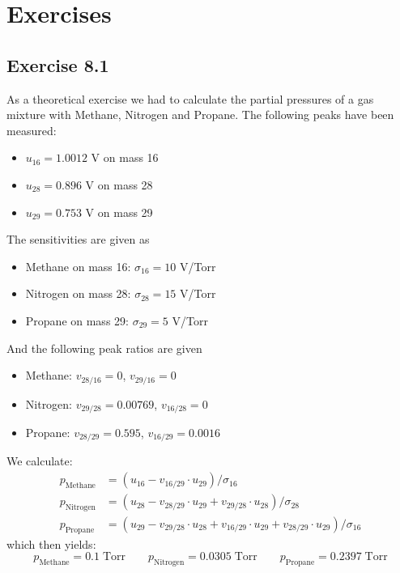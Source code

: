 \section{Exercises} \label{app:ex}
\subsection{Exercise 8.1}
As a theoretical exercise we had to calculate the partial pressures of a gas mixture with Methane, Nitrogen and Propane. The following peaks have been measured: 
\begin{itemize}
    \item $u_{16} = 1.0012$ V on mass 16
    \item $u_{28} = 0.896$ V on mass 28
    \item $u_{29} = 0.753$ V on mass 29
\end{itemize}
The sensitivities are given as
\begin{itemize}
    \item Methane on mass 16: $\sigma_{16} = 10$ V/Torr
    \item Nitrogen on mass 28: $\sigma_{28} = 15$ V/Torr
    \item Propane on mass 29: $\sigma_{29} = 5$ V/Torr
\end{itemize}
And the following peak ratios are given
\begin{itemize}
    \item Methane: $v_{28/16} = 0$, \qquad \quad\;\; $v_{29/16} = 0$
    \item Nitrogen: $v_{29/28} = 0.00769$,  \quad $v_{16/28} = 0$
    \item Propane: $v_{28/29} = 0.595$,  \;\qquad $v_{16/29} = 0.0016$
\end{itemize}
We calculate:
\begin{align}
    p_\text{Methane} &= (u_{16} - v_{16/29}\cdot u_{29})/\sigma_{16}\\
    p_\text{Nitrogen} &= (u_{28} - v_{28/29}\cdot u_{29} + v_{29/28}\cdot u_{28})/\sigma_{28} \\
    p_\text{Propane} &= (u_{29} - v_{29/28}\cdot u_{28} + v_{16/29}\cdot u_{29} + v_{28/29}\cdot u_{29})/\sigma_{16}
\end{align}
which then yields:
$$ p_\text{Methane} = 0.1 \;\text{Torr}  \qquad  p_\text{Nitrogen} = 0.0305 \;\text{Torr} \qquad  p_\text{Propane} = 0.2397 \;\text{Torr}$$

\pagebreak
